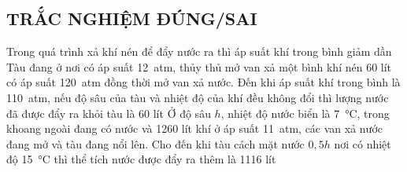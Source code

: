 \subsection{TRẮC NGHIỆM ĐÚNG/SAI}
\setcounter{ex}{0}
\begin{ex}
	{\True Trong quá trình xả khí nén để đẩy nước ra thì áp suất khí trong bình giảm dần}
	{Tàu đang ở nơi có áp suất \SI{12}{atm}, thủy thủ mở van xả một bình khí nén 60 lít có áp suất \SI{120}{atm} đồng thời mở van xả nước. Đến khi áp suất khí trong bình là \SI{110}{atm}, nếu độ sâu của tàu và nhiệt độ của khí đều không đổi thì lượng nước đã được đẩy ra khỏi tàu là 60 lít}
	{\True Ở độ sâu $h$, nhiệt độ nước biển là \SI{7}{\celsius}, trong khoang ngoài đang có nước và 1260 lít khí ở áp suất \SI{11}{atm}, các van xả nước đang mở và tàu đang nổi lên. Cho đến khi tàu cách mặt nước $0,5h$ nơi có nhiệt độ \SI{15}{\celsius} thì thể tích nước được đẩy ra thêm là 1116 lít}
\end{ex}
